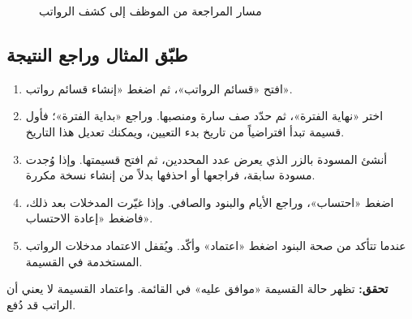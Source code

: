 \begin{figure}[H]
\centering
{}
\rclegend
\caption{مسار المراجعة من الموظف إلى كشف الرواتب}
\label{fig:hr-review-flow}
\end{figure}

\subsection{طبّق المثال وراجع النتيجة}

\begin{enumerate}
  \item افتح «قسائم الرواتب»، ثم اضغط «إنشاء قسائم رواتب».
  \item اختر «نهاية الفترة»، ثم حدّد صف سارة ومنصبها. وراجع «بداية الفترة»؛ فأول قسيمة تبدأ افتراضياً من تاريخ بدء التعيين، ويمكنك تعديل هذا التاريخ.
  \item أنشئ المسودة بالزر الذي يعرض عدد المحددين، ثم افتح قسيمتها. وإذا وُجدت مسودة سابقة، فراجعها أو احذفها بدلاً من إنشاء نسخة مكررة.
  \item اضغط «احتساب»، وراجع الأيام والبنود والصافي. وإذا غيّرت المدخلات بعد ذلك، فاضغط «إعادة الاحتساب».
  \item عندما تتأكد من صحة البنود اضغط «اعتماد» وأكّد. ويُقفل الاعتماد مدخلات الرواتب المستخدمة في القسيمة.
\end{enumerate}

\textbf{تحقق:} تظهر حالة القسيمة «موافق عليه» في القائمة. واعتماد القسيمة لا يعني أن الراتب قد دُفع.

